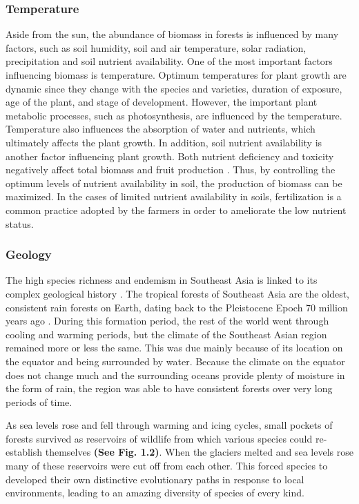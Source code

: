 \subsubsection {Temperature}
	Aside from the sun, the abundance of biomass in forests is influenced by many factors, such as soil humidity, soil and air temperature, solar radiation, precipitation and soil nutrient availability. One of the most important factors influencing biomass is temperature. Optimum temperatures for plant growth are dynamic since they change with the species and varieties, duration of exposure, age of the plant, and stage of development\citep{marshall1988environmental}. However, the important plant metabolic processes, such as photosynthesis, are influenced by the temperature. Temperature also influences the absorption of water and nutrients, which ultimately affects the plant growth. In addition, soil nutrient availability is another factor influencing plant growth. Both nutrient deficiency and toxicity negatively affect total biomass and fruit production \citep{chatzistathis2013soil}. Thus, by controlling the optimum levels of nutrient availability in soil, the production of biomass can be maximized. In the cases of limited nutrient availability in soils, fertilization is a common practice adopted by the farmers in order to ameliorate the low nutrient status. 

\subsubsection {Geology}
	The high species richness and endemism in Southeast Asia is linked to its complex geological history \citep{sodhi2004southeast}. The tropical forests of Southeast Asia are the oldest, consistent rain forests on Earth, dating back to the Pleistocene Epoch 70 million years ago \cite{hutchison1989geological}. During this formation period, the rest of the world went through cooling and warming periods, but the climate of the Southeast Asian region remained more or less the same. This was due mainly because of its location on the equator and being surrounded by water. Because the climate on the equator does not change much and the surrounding oceans provide plenty of moisture in the form of rain, the region was able to have consistent forests over very long periods of time. 

  As sea levels rose and fell through warming and icing cycles, small pockets of forests survived as reservoirs of wildlife from which various species could re-establish themselves \textbf{(See Fig. 1.2)}. When the glaciers melted and sea levels rose many of these reservoirs were cut off from each other. This forced species to developed their own distinctive evolutionary paths in response to local environments, leading to an amazing diversity of species of every kind.
  
